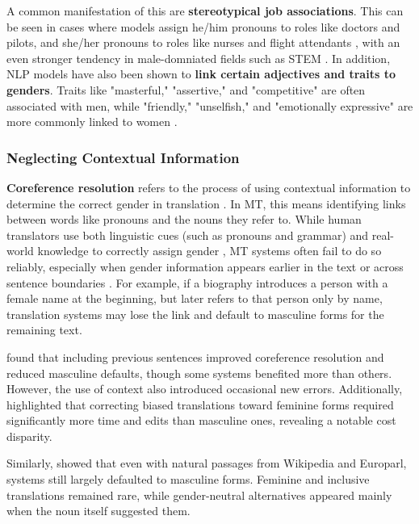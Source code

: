A common manifestation of this are \textbf{stereotypical job associations}. This can be seen in cases where models assign he/him pronouns to roles like doctors and pilots, and she/her pronouns to roles like nurses and flight attendants \citep{shresthaExploringGenderBiases2022}, with an even stronger tendency in male-domniated fields such as STEM \citep{pratesAssessingGenderBias2019}. In addition, NLP models have also been shown to \textbf{link certain adjectives and traits to genders}. Traits like "masterful," "assertive," and "competitive" are often associated with men, while "friendly," "unselfish," and "emotionally expressive" are more commonly linked to women \citep{godsilEffectsGenderRoles2016}.

\subsubsection{Neglecting Contextual Information}

\textbf{Coreference resolution} refers to the process of using contextual information to determine the correct gender in translation \citep{stanczakSurveyGenderBias2021}. In MT, this means identifying links between words like pronouns and the nouns they refer to. While human translators use both linguistic cues (such as pronouns and grammar) and real-world knowledge to correctly assign gender \citep{rescignoGenderBiasMachine2023}, MT systems often fail to do so reliably, especially when gender information appears earlier in the text or across sentence boundaries \citep{choMeasuringGenderBias2019,stanovskyEvaluatingGenderBias2019}. For example, if a biography introduces a person with a female name at the beginning, but later refers to that person only by name, translation systems may lose the link and default to masculine forms for the remaining text.

\citet{rescignoGenderBiasMachine2023} found that including previous sentences improved coreference resolution and reduced masculine defaults, though some systems benefited more than others. However, the use of context also introduced occasional new errors. Additionally, \citet{savoldiWhatHarmQuantifying2024} highlighted that correcting biased translations toward feminine forms required significantly more time and edits than masculine ones, revealing a notable cost disparity.

Similarly, \citet{lardelliBuildingBridgesDataset2024} showed that even with natural passages from Wikipedia and Europarl, systems still largely defaulted to masculine forms. Feminine and inclusive translations remained rare, while gender-neutral alternatives appeared mainly when the noun itself suggested them.

